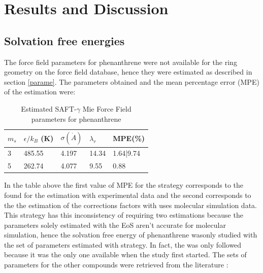 \chapter{Results and Discussion} %

\label{Chapter5} %

\section{Solvation free energies}

The force field parameters for phenanthrene were not available for the ring geometry on the force field database, hence they were estimated as described in section \ref{parame}. The parameters obtained and the mean percentage error (MPE) of the estimation were:

\begin{table}[h]
	\centering
	\caption{Estimated SAFT-$\gamma$ Mie Force Field parameters for phenanthrene}
	\label{tbl:estimparameters}
	\begin{tabular}{lllll}
		\hline
		 $m_s$ & $\epsilon/k_{B}$ (K) & $\sigma (\dot{A})$ & $\lambda_r$& MPE(\%) \\ \hline
		 3 \cite{lafitte2012}    & 485.55              & 4.197              & 14.34 & 1.64|9.74       \\ 
		 5  \cite{muller2017}   & 262.74               & 4.077              & 9.55   &  0.88   \\ \hline
	\end{tabular}
	
\end{table} 

In the table above the first value of MPE for the  strategy corresponds to the found for the estimation with experimental data and the second corresponds to the the estimation of the corrections factors with uses molecular simulation data. This strategy has this inconsistency of requiring two estimations because the parameters solely  estimated with the EoS aren't accurate for molecular simulation, hence the solvation free energy of phenanthrene wasonly studied with the set of parameters estimated with  strategy. In fact, the \cite{lafitte2012} was only followed because it was the only one available when the study first started. The sets of parameters for the other compounds were retrieved from the literature \cite{lobanova2016,herdes2015,ervik2016,muller2017}:

